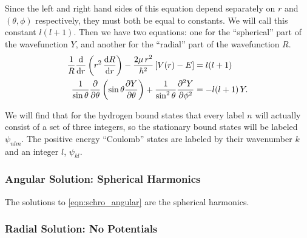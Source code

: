 \documentclass[12pt]{article}
\numberwithin{equation}{section}
\begin{document}
Since the left and right hand sides of this equation depend separately on $r$ and $(\theta, \phi)$ respectively, they must both be equal to constants. We will call this constant $l(l+1)$. Then we have two equations: one for the ``spherical'' part of the wavefunction $Y$, and another for the ``radial'' part of the wavefunction $R$.
\begin{align}
\label{eqn:schro_radial}
\frac{1}{R} \dv{r} \left(r^2 \, \dv{R}{r}\right) - \frac{2\mu \, r^2}{\hbar^2} \left[V(r) - E\right] &= l(l+1) \\
\label{eqn:schro_angular}
\frac{1}{\sin{\theta}} \pdv{\theta} \left(\sin{\theta} \pdv{Y}{\theta}\right) + \frac{1}{\sin^2{\theta}} \pdv[2]{Y}{\phi} &= -l(l+1) \, Y.
\end{align}

We will find that for the hydrogen bound states that every label $n$ will actually consist of a set of three integers, so the stationary bound states will be labeled $\psi_{nlm}$. The positive energy ``Coulomb'' states are labeled by their wavenumber $k$ and an integer $l$, $\psi_{kl}$.

\subsubsection{Angular Solution: Spherical Harmonics}

The solutions to \eqref{eqn:schro_angular} are the spherical harmonics.

\subsubsection{Radial Solution: No Potentials}
\end{document}
